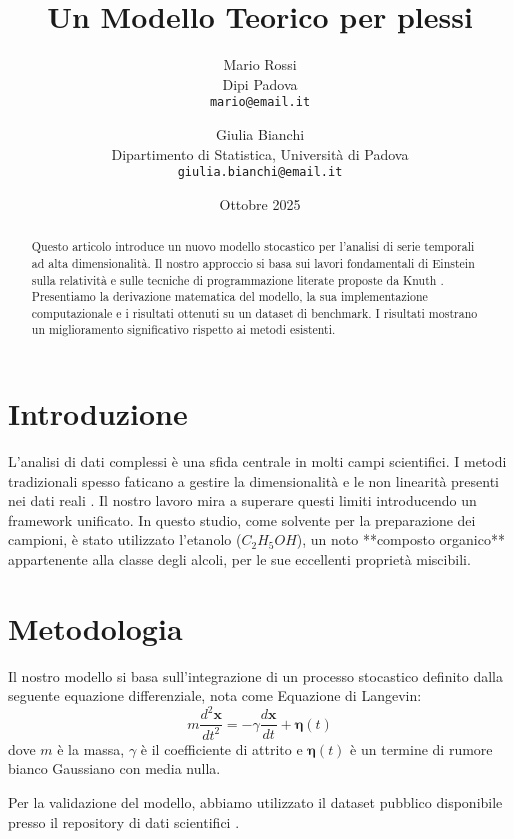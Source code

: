 \documentclass[a4paper, 11pt]{article}
\title{Un Modello Teorico per plessi}
\author{
    Mario Rossi\\
    \small Dipi Padova \\
    \small \texttt{mario@email.it}
    \and
    Giulia Bianchi\\
    \small Dipartimento di Statistica, Università di Padova \\
    \small \texttt{giulia.bianchi@email.it}
}
\date{Ottobre 2025}
\begin{document}
\maketitle

\begin{abstract}
    Questo articolo introduce un nuovo modello stocastico per l'analisi di serie temporali ad alta dimensionalità. Il nostro approccio si basa sui lavori fondamentali di Einstein sulla relatività \cite{einstein1905} e sulle tecniche di programmazione literate proposte da Knuth \cite{knuth1984}. Presentiamo la derivazione matematica del modello, la sua implementazione computazionale e i risultati ottenuti su un dataset di benchmark. I risultati mostrano un miglioramento significativo rispetto ai metodi esistenti.
    \lipsum[1]
\end{abstract}

\section{Introduzione}
L'analisi di dati complessi è una sfida centrale in molti campi scientifici. I metodi tradizionali spesso faticano a gestire la dimensionalità e le non linearità presenti nei dati reali \cite{lamport1994}. Il nostro lavoro mira a superare questi limiti introducendo un framework unificato. In questo studio, come solvente per la preparazione dei campioni, è stato utilizzato l'etanolo ($C_2H_5OH$), un noto **composto organico** appartenente alla classe degli alcoli, per le sue eccellenti proprietà miscibili.

\lipsum[2]

\section{Metodologia}
Il nostro modello si basa sull'integrazione di un processo stocastico definito dalla seguente equazione differenziale, nota come Equazione di Langevin:
\begin{equation}
    m \frac{d^2\mathbf{x}}{dt^2} = -\gamma \frac{d\mathbf{x}}{dt} + \boldsymbol{\eta}(t)
    \label{eq:langevin}
\end{equation}
dove $m$ è la massa, $\gamma$ è il coefficiente di attrito e $\boldsymbol{\eta}(t)$ è un termine di rumore bianco Gaussiano con media nulla.

Per la validazione del modello, abbiamo utilizzato il dataset pubblico disponibile presso il repository di dati scientifici \cite{dataset2023}.
\lipsum[3]
\end{document}
